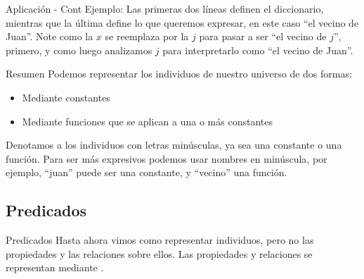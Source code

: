 
\begin{frame}{Aplicación - Cont}
  Ejemplo:
  \jump
  \jump
  Las primeras dos líneas definen el diccionario, mientras que la última define
  lo que queremos expresar, en este caso ``el vecino de Juan''.
  \jump
  Note como la $x$ se reemplaza por la $j$ para pasar a ser ``el vecino de $j$'',
  primero, y como luego analizamos $j$ para interpretarlo como ``el vecino de Juan''.
\end{frame}


\begin{frame}{Resumen}
  Podemos representar los individuos de nuestro universo de dos formas:
  \begin{itemize}
    \item Mediante constantes
    \item Mediante funciones que se aplican a una o más constantes
  \end{itemize}
  \jump
  Denotamos a los individuos con letras minúsculas, ya sea una constante o una
  función.
  \jump
  Para ser más expresivos podemos usar nombres en minúscula, por ejemplo, ``juan''
  puede ser una constante, y ``vecino'' una función.
\end{frame}


\subsection{Predicados}


\begin{frame}{Predicados}
  Hasta ahora vimos como representar individuos, pero no las propiedades y
  las relaciones sobre ellos.
  \jump
  Las propiedades y relaciones se representan mediante .
  \jump
  \jump
\end{frame}

